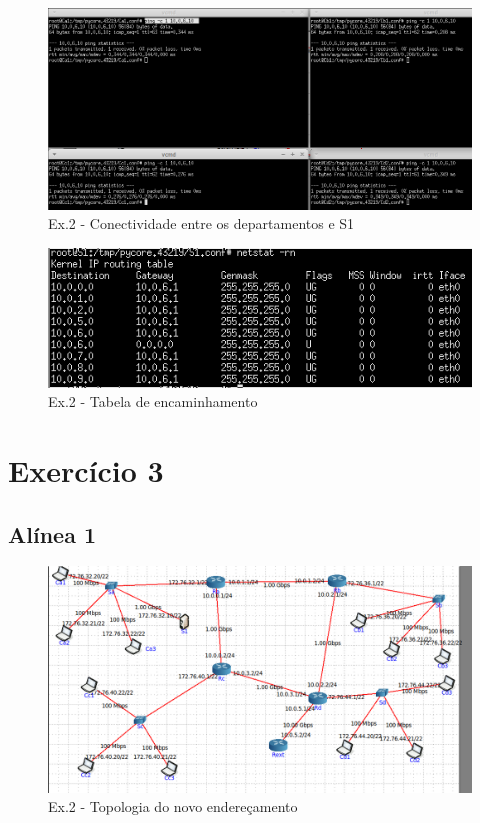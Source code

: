 \documentclass[a4paper]{report}
\begin{document}
\begin{figure}[H]
    \centering 
    \includegraphics[width=\textwidth]{images/conectividadeDep.png}
    \caption{Ex.2 - Conectividade entre os departamentos e S1}
    \label{fig:conectividadeDep}
\end{figure}

\begin{figure}[H]
    \centering 
    \includegraphics[width=\textwidth]{images/tabS1.png}
    \caption{Ex.2 - Tabela de encaminhamento}
    \label{fig:tabS1}
\end{figure}

\section{Exercício 3}

\subsection{Alínea 1}

\begin{figure}[H]
    \centering 
    \includegraphics[width=\textwidth]{images/topCoreEx3.png}
    \caption{Ex.2 - Topologia do novo endereçamento}
    \label{fig:topCoreEx3}
\end{figure}
\end{document}
